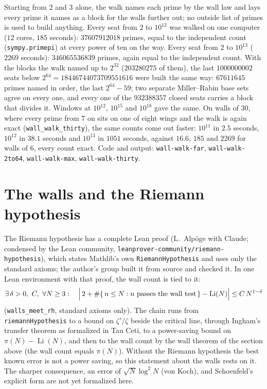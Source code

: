 \documentclass[11pt]{article}
\begin{document}
Starting from $2$ and $3$ alone, the walk names each prime by the wall law and lays every prime it names as a block for the walls further out; no outside list of primes is used to build anything. Every seat from $2$ to $10^{12}$ was walked on one computer ($12$ cores, $185$ seconds): $37607912018$ primes, equal to the independent count (\texttt{sympy.primepi}) at every power of ten on the way. Every seat from $2$ to $10^{13}$ ($2269$ seconds): $346065536839$ primes, again equal to the independent count. With the blocks the walk named up to $2^{32}$ ($203280275$ of them), the last $1000000002$ seats below $2^{64} = 18446744073709551616$ were built the same way: $67611645$ primes named in order, the last $2^{64}-59$; two separate Miller--Rabin base sets agree on every one, and every one of the $932388357$ closed seats carries a block that divides it. Windows at $10^{12}$, $10^{15}$ and $10^{18}$ gave the same. On walls of $30$, where every prime from $7$ on sits on one of eight wings and the walk is again exact (\texttt{wall\_walk\_thirty}), the same counts come out faster: $10^{11}$ in $2.5$ seconds, $10^{12}$ in $38.1$ seconds and $10^{13}$ in $1051$ seconds, against $16.6$, $185$ and $2269$ for walls of $6$, every count exact. Code and output: \texttt{wall-walk-far}, \texttt{wall-walk-2to64}, \texttt{wall-walk-max}, \texttt{wall-walk-thirty}.

\section{The walls and the Riemann hypothesis}
The Riemann hypothesis has a complete Lean proof (L.~Alp\"oge with Claude; condensed by the Lean community, \texttt{leanprover-community/riemann-hypothesis}), which states Mathlib's own \texttt{RiemannHypothesis} and uses only the standard axioms; the author's group built it from source and checked it. In one Lean environment with that proof, the wall count is tied to it:
\[ \exists\, \delta>0,\ C,\ \forall N\ge3:\quad \Bigl|\, 2 + \#\{\, n\le N : n \text{ passes the wall test} \,\} - \operatorname{Li}(N) \Bigr| \le C\, N^{1-\delta} \]
(\texttt{walls\_meet\_rh}, standard axioms only). The chain runs from \texttt{riemannHypothesis} to a bound on $\zeta'/\zeta$ beside the critical line, through Ingham's transfer theorem as formalized in Tau Ceti, to a power-saving bound on $\pi(N) - \operatorname{Li}(N)$, and then to the wall count by the wall theorem of the section above (the wall count equals $\pi(N)$). Without the Riemann hypothesis the best known error is not a power saving, so this statement about the walls rests on it. The sharper consequence, an error of $\sqrt{N}\log^2 N$ (von Koch), and Schoenfeld's explicit form are not yet formalized here.
\end{document}
